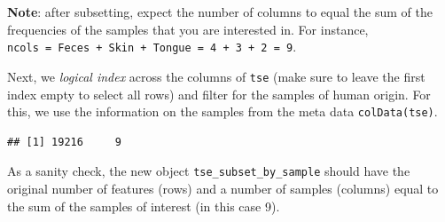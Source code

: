 \documentclass[
]{book}
\newenvironment{Shaded}{\begin{snugshade}}{\end{snugshade}}
\newcommand{\CommentTok}[1]{\textcolor[rgb]{0.56,0.35,0.01}{\textit{#1}}}
\newcommand{\FunctionTok}[1]{\textcolor[rgb]{0.00,0.00,0.00}{#1}}
\newcommand{\NormalTok}[1]{#1}
\newcommand{\OtherTok}[1]{\textcolor[rgb]{0.56,0.35,0.01}{#1}}
\newcommand{\SpecialCharTok}[1]{\textcolor[rgb]{0.00,0.00,0.00}{#1}}
\newcommand{\StringTok}[1]{\textcolor[rgb]{0.31,0.60,0.02}{#1}}
\begin{document}
\begin{table}
\centering
{}
\end{table}

\textbf{Note}: after subsetting, expect the number of columns to equal the
sum of the frequencies of the samples that you are interested
in. For instance, \texttt{ncols\ =\ Feces\ +\ Skin\ +\ Tongue\ =\ 4\ +\ 3\ +\ 2\ =\ 9}.

Next, we \emph{logical index} across the columns of \texttt{tse} (make sure to
leave the first index empty to select all rows) and filter for the
samples of human origin. For this, we use the information on the
samples from the meta data \texttt{colData(tse)}.

\begin{Shaded}
\end{Shaded}

\begin{verbatim}
## [1] 19216     9
\end{verbatim}

As a sanity check, the new object \texttt{tse\_subset\_by\_sample} should have
the original number of features (rows) and a number of samples
(columns) equal to the sum of the samples of interest (in this case
9).
\end{document}
